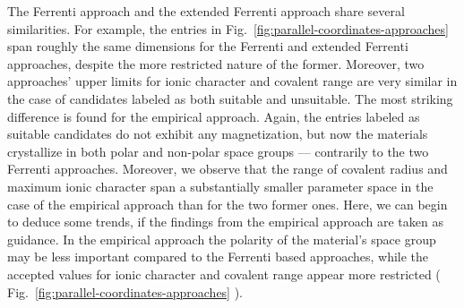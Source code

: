 \documentclass[superscriptaddress,unsortedaddress,
 amsmath,amssymb,
 aps,
]{revtex4-2}
\begin{document}
The Ferrenti approach and the extended Ferrenti approach share several similarities. For example, the entries in  Fig.~\ref{fig:parallel-coordinates-approaches} span roughly the same dimensions for the Ferrenti and extended Ferrenti approaches, despite the more restricted nature of the former.  
Moreover, two approaches' upper limits for ionic character and covalent range are very similar in the case of candidates labeled as both suitable and unsuitable.   
The most striking difference is found for the empirical approach. Again, the entries labeled as suitable candidates do not exhibit any magnetization, but now the materials crystallize in both polar and non-polar space groups --- contrarily to the two Ferrenti approaches. Moreover, we observe that the range of covalent radius and maximum ionic character span a substantially smaller parameter space in the case of the empirical approach than for the two former ones.  
Here, we can begin to deduce some trends, if the findings from the empirical approach are taken as guidance. In the empirical approach the polarity of the material's space group may be less important compared to the Ferrenti based approaches, while the accepted values for ionic character and covalent range appear more restricted ( Fig.~\ref{fig:parallel-coordinates-approaches} ). 
\end{document}
